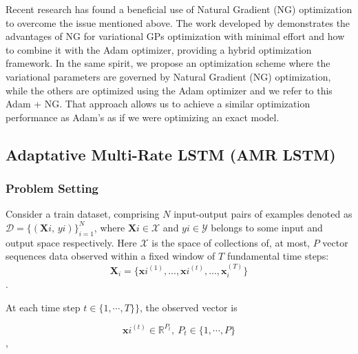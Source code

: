 Recent research has found a beneficial use of Natural Gradient (NG) optimization to overcome the issue mentioned above. The work developed by \cite{pmlr-v84-salimbeni18a} demonstrates the advantages of NG for variational GPs optimization with minimal effort and how to combine it with the Adam optimizer, providing a hybrid optimization framework. In the same spirit, we propose an optimization scheme where the variational parameters are governed by Natural Gradient (NG) optimization, while the others are optimized using the Adam optimizer and we refer to this Adam + NG. That approach allows us to achieve a similar optimization performance as Adam's as if we were optimizing an exact model.


\subsection{Adaptative Multi-Rate LSTM (AMR LSTM)}

\subsubsection{Problem Setting}

Consider a train dataset, comprising \(N\) input-output pairs of examples denoted as  $\mathcal{D} = \{(\boldsymbol{X}{i},\,y{i})\}_{i=1}^N$, where 
$\boldsymbol{X}{i}\in\mathcal{X}$ and $y{i}\in\mathcal{Y}$ belongs to some input and output space respectively. Here $\mathcal{X}$ is the space of collections of, at most, \(P\) vector sequences data observed within a fixed window of \(T\) fundamental time steps:
\[
\boldsymbol{X}_i
= \bigl\{\boldsymbol{x}{i}^{(1)}, \dots, \boldsymbol{x}{i}^{(t)}, \dots,\boldsymbol{x}_{i}^{(T)}\bigr\}
\].

At each time step \(t \in \{1, \cdots, T\}\}\), the observed vector is

\[
\boldsymbol{x}{i}^{(t)} \in \mathbb{R}^{P_t},~P_t \in \{1, \cdots, P\}
\],



